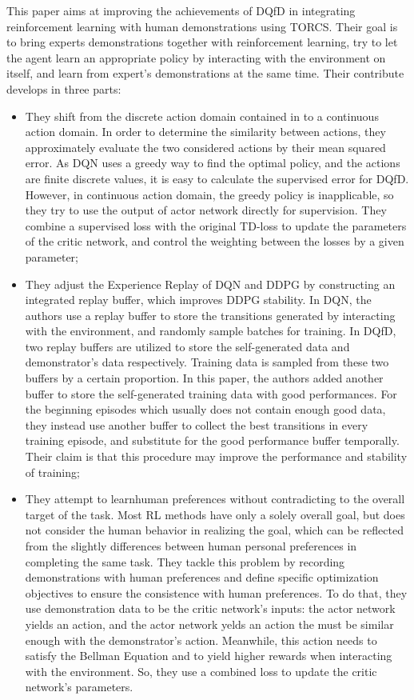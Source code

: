 This paper \cite{cinesi} aims at improving the achievements of DQfD \cite{dqlfd} in integrating reinforcement learning with human demonstrations using TORCS.
Their goal is to bring experts demonstrations together with reinforcement learning, try to let the agent learn an appropriate policy by interacting with the environment on itself, and learn from expert’s demonstrations at the same time.
Their contribute develops in three parts:
\begin{itemize}
\item They shift from the discrete action domain contained in \cite{dqlfd} to a continuous action domain.
In order to determine the similarity between actions, they approximately evaluate the two considered actions by their mean squared error.  As DQN uses a greedy way to find the optimal policy, and the actions are finite discrete values, it is easy to calculate the supervised error for DQfD. However, in continuous action domain, the greedy policy is inapplicable, so they try to use the output of actor network directly for supervision. They combine a supervised loss with the original TD-loss to update the parameters of the critic network, and control the weighting between the losses by a given parameter;
\item They adjust the Experience Replay of DQN and DDPG by constructing an integrated replay buffer, which improves DDPG stability.  In DQN, the authors use a replay buffer to store the transitions generated by interacting with the environment, and randomly sample batches for training. In DQfD, two replay buffers are utilized to store the self-generated data and demonstrator’s data respectively. Training data is sampled from these two buffers by a certain proportion. In this paper, the authors added another buffer to store the self-generated training data with good performances. 
For the beginning episodes which usually does not contain enough good data, they instead use another buffer to collect the best transitions in every training episode, and substitute for the good performance buffer temporally. 
Their claim is that this procedure may improve the performance and stability of training;
\item  They attempt to learnhuman preferences without contradicting to the overall target of the task. Most RL methods have only a solely overall goal, but does not consider the human behavior in realizing the goal, which can be reflected from the slightly differences between human personal preferences in completing the same task. They tackle this problem by recording demonstrations with human preferences and define specific optimization objectives to ensure the consistence with human preferences. To do that, they use demonstration data to be the critic network’s inputs: the actor network yields an action, and the actor network yelds an action the must be similar enough with the demonstrator’s action. Meanwhile, this action needs to satisfy the Bellman Equation and to yield higher rewards when interacting with the environment. So, they use a combined loss to update the critic network’s parameters.
\end{itemize}
